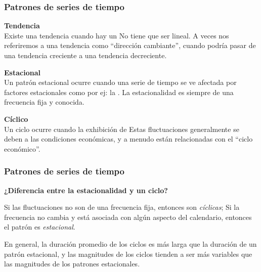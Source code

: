 \documentclass[10pt]{beamer}
\begin{document}
\begin{frame}[fragile]
\frametitle{Patrones de series de tiempo}

\textbf{Tendencia}\\

Existe una tendencia cuando hay un  No tiene que ser lineal. A veces nos referiremos a una tendencia como ``dirección cambiante'', cuando podría pasar de una tendencia creciente a una tendencia decreciente.

\pause
\vspace{4mm}

\textbf{Estacional}\\

Un patrón estacional ocurre cuando una serie de tiempo se ve afectada por factores estacionales como por ej: la . La estacionalidad es siempre de una frecuencia fija y conocida. 


\pause
\vspace{4mm}

\textbf{Cíclico}\\

Un ciclo ocurre cuando la exhibición de  Estas fluctuaciones generalmente se deben a las condiciones económicas, y a menudo están relacionadas con el ``ciclo económico''.

\end{frame}







\begin{frame}[fragile]
\frametitle{Patrones de series de tiempo}

\textbf{¿Diferencia entre la estacionalidad y un ciclo?}\\

\pause
\vspace{4mm}

Si las fluctuaciones no son de una frecuencia fija, entonces son \textit{cíclicas}; Si la frecuencia no cambia y está asociada con algún aspecto del calendario, entonces el patrón es \textit{estacional}. 

\vspace{4mm}

\begin{block}{}
En general, la duración promedio de los ciclos es más larga que la duración de un patrón estacional, y las magnitudes de los ciclos tienden a ser más variables que las magnitudes de los patrones estacionales.
\end{block}



\end{frame}
\end{document}
